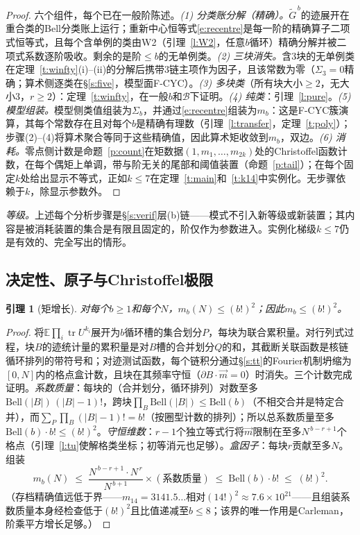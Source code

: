\documentclass[11pt]{article}
\numberwithin{equation}{section}
\newtheorem{lemma}[theorem]{引理}
\theoremstyle{definition}
\theoremstyle{remark}
\begin{document}
\begin{proof}
六个组件，每个已在一般阶陈述。\emph{(1) 分类账分解（精确）。}$\widetilde G^{\,b}$的迹展开在重合类的Bell分类账上运行；重新中心恒等式\eqref{e:recentre}是每一阶的精确算子二项式恒等式，且每个含单例的类由W2（引理~\ref{l:W2}，任意$b$循环）精确分解并被二项式系数逐阶吸收。剩余的是阶$\le b$的无单例类。\emph{(2) 三块消失。}含$3$块的无单例类在定理~\ref{t:winfty}(i)--(ii)的分解后携带$3$链主项作为因子，且该常数为零（$\Sigma_3=0$精确；算术侧逐类在\S\ref{s:five}，模型面F-CYC）。\emph{(3) 多块类}（所有块大小$\ge2$，无大小$3$，$r\ge2$）：定理~\ref{t:winfty}，在一般$b$和$\mathcal B$下证明。\emph{(4) 纯类}：引理~\ref{l:pure}。\emph{(5) 模型组装。}模型侧类值组装为$\Sigma_b$，并通过\eqref{e:recentre}组装为$m_b$：这是F-CYC簇演算，其每个常数存在且对每个$b$是精确有理数（引理~\ref{l:transfer}，定理~\ref{t:poly}）；步骤(2)--(4)将算术聚合等同于这些精确值，因此算术矩收敛到$m_b$，双边。\emph{(6) 消耗。}零点侧计数是命题~\ref{p:count}在矩数据$(1,m_1,\dots,m_{2k})$处的Christoffel函数计数，在每个偶矩上单调，带与阶无关的尾部和阈值装置（命题~\ref{p:tail}）；在每个固定$k$处给出显示不等式，正如$k\le7$在定理~\ref{t:main}和~\ref{t:k14}中实例化。无步骤依赖于$k$，除显示参数外。
\end{proof}

\noindent\emph{等级。}上述每个分析步骤是\S\ref{s:verif}层(b)链——模式不引入新等级或新装置；其内容是被消耗装置的集合是有限且固定的，阶仅作为参数进入。实例化梯级$k\le7$仍是有效的、完全写出的情形。

\subsection{决定性、原子与Christoffel极限}\label{s:soft}

\begin{lemma}[矩增长]\label{l:growth}
对每个$b\ge1$和每个$N$，$m_b(N)\le(b!)^2$；因此$m_b\le(b!)^2$。
\end{lemma}

\begin{proof}
将$\mathbb E\prod_{i}\operatorname{tr}U^{k_i}$展开为$b$循环槽的集合划分$P$，每块为联合累积量。对行列式过程，块$B$的迹统计量的累积量是对$B$槽的合并划分$Q$的和，其截断关联函数是核链循环排列的带符号和\cite{Sos00}；对迹测试函数，每个链积分通过\S\ref{s:tt}的Fourier机制坍缩为$[0,N]$内的格点盒计数，且块在其频率守恒（$\partial B\cdot\vec m=0$）时消失。三个计数完成证明。\emph{系数质量}：每块的（合并划分，循环排列）对数至多$\mathrm{Bell}(|B|)\,(|B|-1)!$，跨块$\prod_B\mathrm{Bell}(|B|)\le\mathrm{Bell}(b)$（不相交合并是特定合并），而$\sum_P\prod_B(|B|-1)!=b!$（按圈型计数的排列）；所以总系数质量至多$\mathrm{Bell}(b)\cdot b!\le(b!)^2$。\emph{守恒维数}：$r-1$个独立等式行将$\vec m$限制在至多$N^{\,b-r+1}$个格点（引理~\ref{l:tu}使解格类坐标；初等消元也足够）。\emph{盒因子}：每块$r$贡献至多$N$。组装
\[
m_b(N)\;\le\;\frac{N^{\,b-r+1}\cdot N^{\,r}}{N^{\,b+1}}
\times(\text{系数质量})
\;\le\;\mathrm{Bell}(b)\cdot b!\;\le\;(b!)^2 .
\]
（存档精确值远低于界——$m_{14}=3141.5\ldots$相对$(14!)^2\approx7.6\times10^{21}$——且组装系数质量本身经检查低于$(b!)^2$且比值递减至$b\le8$；该界的唯一作用是Carleman，阶乘平方增长足够。）
\end{proof}
\end{document}
